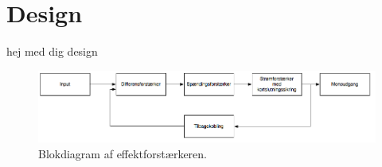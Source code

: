 \section{Design}
hej med dig design

\begin{figure}[h]
\centering
\includegraphics[scale=0.5]{teknisk/effektforstaerker/blokdiagram-effektforstaerker.png}
\caption{Blokdiagram af effektforstærkeren.}
\label{blokdiagram_effektforstaerker}
\end{figure}
